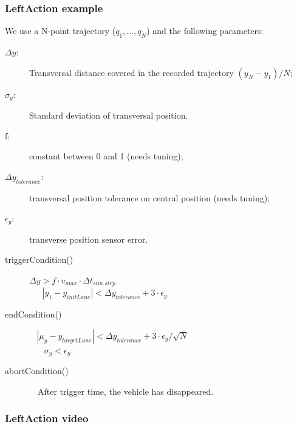 \documentclass{beamer}
\begin{document}
\begin{frame}
\frametitle{LeftAction example}

We use a N-point trajectory ($q_1, ..., q_N$) and the following parameters:
\begin{description}
\item[\color{dred}$\Delta y$:] Transversal distance covered in the recorded trajectory $(y_N - y_1)/N$;
\item[\color{dred}$\sigma_y$:] Standard deviation of transversal position.
\item[\color{dred}f:] constant between 0 and 1 (needs tuning);
\item[\color{dred}$\Delta y_{tolerance}$:] transversal position tolerance on central position (needs tuning);
\item[\color{dred}$\epsilon_y$:] transverse position sensor error. 
\end{description}

\bigskip

\begin{description}
\item[triggerCondition()] 
$ \Delta y > f\cdot v_{max}\cdot \Delta t_{sim. step}$ \\
 $\ \ \ \ \ \ \ |y_{1} - y_{initLane}| < \Delta y_{tolerance} + 3\cdot\epsilon_y$

\item[endCondition()] 
$\ \ \ \ |\mu_y - y_{targetLane}| < \Delta y_{tolerance} + 3\cdot\epsilon_y/\sqrt{N}$ \\
$\ \ \ \ \ \ \ \ \sigma_y < \epsilon_y$

\item[abortCondition()] \ \ After trigger time, the vehicle has disappeared.
 
\end{description}
\end{frame}

\begin{frame}
\frametitle{LeftAction video}


\end{frame}
\end{document}
